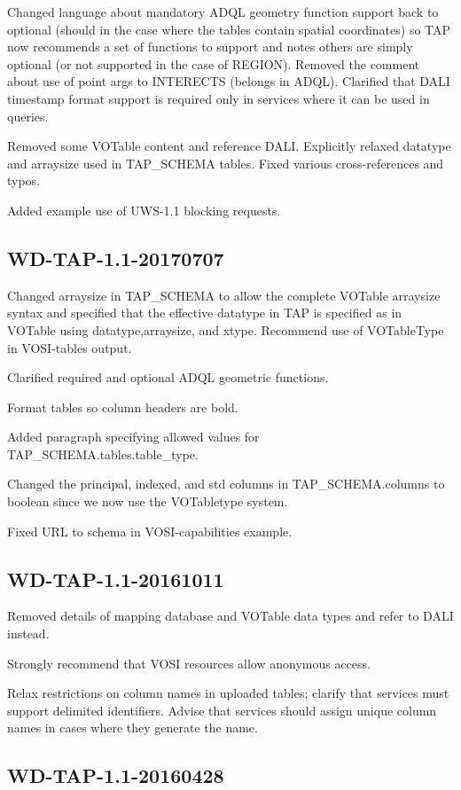 \documentclass[11pt,letter]{ivoa}
\newcommand{\tapschema}{TAP\_SCHE\-MA}
\newcommand{\tapschema}{\mbox{%
  \relsize{-0.5}TAP\discretionary{-}{}{\kern-2pt\_}SCHEMA}}
\begin{document}
Changed language about mandatory ADQL geometry function support back to optional (should in
the case where the tables contain spatial coordinates) so TAP now recommends a set of functions to support and notes others are simply optional (or not supported in the case of REGION). Removed the comment about use of point args to INTERECTS (belongs in ADQL). Clarified that DALI timestamp format support is required only in services where it can be used in queries.

Removed some VOTable content and reference DALI. Explicitly relaxed datatype and arraysize used in \tapschema{} tables. Fixed various cross-references and typos. 

Added example use of UWS-1.1 blocking requests.

\subsection{WD-TAP-1.1-20170707}

Changed arraysize in \tapschema{} to allow the complete VOTable arraysize syntax and specified that the effective datatype in TAP is specified as in VOTable using datatype,arraysize, and xtype. Recommend use of VOTableType in VOSI-tables output.

Clarified required and optional ADQL geometric functions.

Format tables so column headers are bold.

Added paragraph specifying allowed values for \tapschema.tables.table\_type.

Changed the principal, indexed, and std columns in \tapschema.columns to boolean since we
now use the VOTabletype system.

Fixed URL to schema in VOSI-capabilities example.

\subsection{WD-TAP-1.1-20161011}

Removed details of mapping database and VOTable data types and refer to DALI 
instead. 

Strongly recommend that VOSI resources allow anonymous access.

Relax restrictions on column names in uploaded tables; clarify that services 
must support delimited identifiers. Advise that services should assign unique 
column names in cases where they generate the name.

\subsection{WD-TAP-1.1-20160428}
\end{document}
